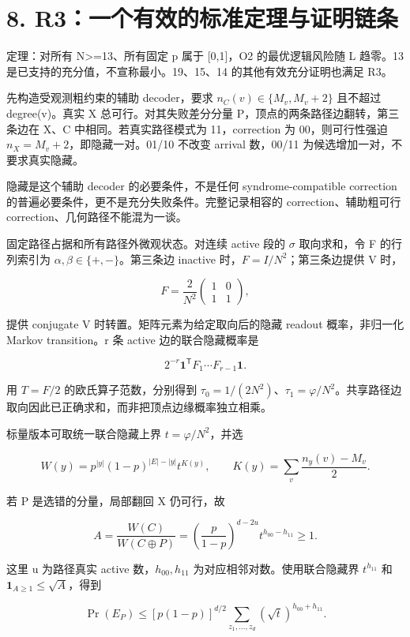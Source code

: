 \documentclass[11pt,a4paper]{article}
\begin{document}
\section*{8. R3：一个有效的标准定理与证明链条}

定理：对所有 N>=13、所有固定 p 属于 [0,1]，O2 的最优逻辑风险随 L 趋零。13 是已支持的充分值，不宣称最小。19、15、14 的其他有效充分证明也满足 R3。

先构造受观测粗约束的辅助 decoder，要求 \(n_C(v)\in\{M_v,M_v+2\}\) 且不超过 degree(v)。真实 X 总可行。对其失败差分分量 P，顶点的两条路径边翻转，第三条边在 X、C 中相同。若真实路径模式为 11，correction 为 00，则可行性强迫 \(n_X=M_v+2\)，即隐藏一对。01/10 不改变 arrival 数，00/11 为候选增加一对，不要求真实隐藏。

隐藏是这个辅助 decoder 的必要条件，不是任何 syndrome-compatible correction 的普遍必要条件，更不是充分失败条件。完整记录相容的 correction、辅助粗可行 correction、几何路径不能混为一谈。

固定路径占据和所有路径外微观状态。对连续 active 段的 \(\sigma\) 取向求和，令 F 的行列索引为 \(\alpha,\beta\in\{+,-\}\)。第三条边 inactive 时，\(F=I/N^2\)；第三条边提供 V 时，

\[
F=\frac2{N^2}\begin{pmatrix}1&0\\1&1\end{pmatrix},
\]

提供 conjugate V 时转置。矩阵元素为给定取向后的隐藏 readout 概率，非归一化 Markov transition。r 条 active 边的联合隐藏概率是

\[
2^{-r}\mathbf1^{\mathsf T}F_1\cdots F_{r-1}\mathbf1.
\]

用 \(T=F/2\) 的欧氏算子范数，分别得到 \(\tau_0=1/(2N^2)\)、\(\tau_1=\varphi/N^2\)。共享路径边取向因此已正确求和，而非把顶点边缘概率独立相乘。

标量版本可取统一联合隐藏上界 \(t=\varphi/N^2\)，并选

\[
W(y)=p^{|y|}(1-p)^{|E|-|y|}t^{K(y)},\qquad
K(y)=\sum_v\frac{n_y(v)-M_v}{2}.
\]

若 P 是选错的分量，局部翻回 X 仍可行，故

\[
A=\frac{W(C)}{W(C\oplus P)}
=\left(\frac p{1-p}\right)^{d-2u}t^{h_{00}-h_{11}}\ge1.
\]

这里 u 为路径真实 active 数，\(h_{00},h_{11}\) 为对应相邻对数。使用联合隐藏界 \(t^{h_{11}}\) 和 \(\mathbf1_{A\ge1}\le\sqrt A\)，得到

\[
\Pr(E_P)\le[p(1-p)]^{d/2}
\sum_{z_1,\ldots,z_d}(\sqrt t)^{h_{00}+h_{11}}.
\]
\end{document}
